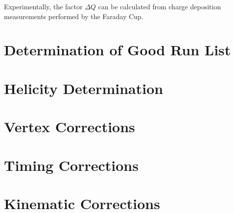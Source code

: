 Experimentally, the factor $\Delta Q$ can be calculated from charge deposition measurements performed by the Faraday Cup.

\section{Determination of Good Run List}

\section{Helicity Determination}

\section{Vertex Corrections}

\section{Timing Corrections}

\section{Kinematic Corrections}
